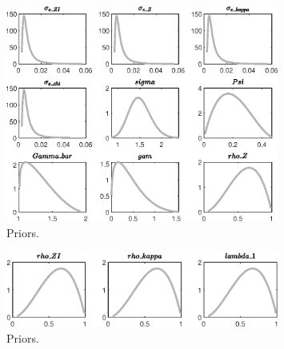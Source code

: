 
\begin{figure}[H]
\centering
\includegraphics[width=0.80\textwidth]{directed_search_simp/graphs/directed_search_simp_Priors1}
\caption{Priors.}\label{Fig:Priors:1}
\end{figure}
\begin{figure}[H]
\centering
\includegraphics[width=0.80\textwidth]{directed_search_simp/graphs/directed_search_simp_Priors2}
\caption{Priors.}\label{Fig:Priors:2}
\end{figure}
 
